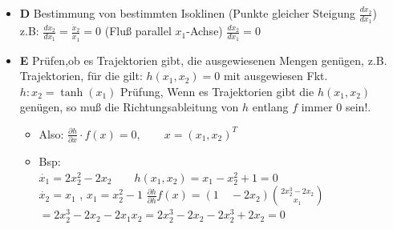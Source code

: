 \documentclass[ngerman]{tudscrreprt}
\begin{document}
\begin{itemize}
\item{\textbf{D}} Bestimmung von bestimmten Isoklinen (Punkte gleicher Steigung $\frac{dx_{2}}{dx_{1}} $)\\
z.B: $\frac{dx_{2}}{dx_{1}} = \frac{\dot x_2}{\dot x_1} = 0$ (Fluß parallel $x_{1}$-Achse)
$\frac{dx_{2}}{dx_{1}}= 0$ 
\item {\textbf{E}} Prüfen,ob es Trajektorien gibt, die ausgewiesenen Mengen genügen, z.B. Trajektorien, für die gilt: $h(x_{1},x_{2})=0$ mit ausgewiesen Fkt. $h: x_{2}=\tanh{(x_{1})}$
Prüfung, Wenn es Trajektorien gibt die $h(x_{1},x_{2})$ genügen, so muß die Richtungsableitung von $h$ entlang $f$ immer $0$ sein!. 
\begin{itemize}
\item Also: $\frac{\partial{h}}{\partial{x}}\cdot f(x) = 0 , \qquad x=(x_{1}, x_{2})^T$
\item Bsp: \\
$\dot{x_{1}} = 2 x_{2}^2 - 2 x_{2} \qquad h(x_{1}, x_{2}) = x_{1} - x_{2}^2 + 1 = 0$ \\
$\dot{x_{2}} = x_{1} $ , $ x_{1}=x_{2}^2 - 1$
\newline
$\frac{\partial{h}}{\partial{h}} f(x) = (1\quad -2x_{2}) \binom{2 x_2^3 - 2x_2}{x_1}$
$ = 2 x_{2}^3 - 2 x_{2} - 2 x_{1} x_{2} = 2 x_{2}^3 - 2 x_{2} - 2 x_{2}^3 + 2 x_{2} = 0$
\end{itemize}
\end{itemize}
\end{document}
